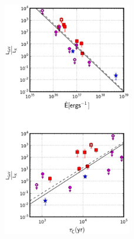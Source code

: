 \clearpage

\begin{figure}[h!]
\centering
\includegraphics[width=0.5\textwidth]{figures/rapport_X.eps}

\end{figure}

